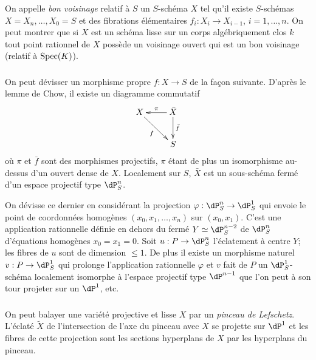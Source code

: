 On appelle \emph{bon voisinage} relatif à $S$ un $S$-schéma $X$ tel qu'il 
existe $S$-schémas $X=X_n,\dotsc,X_0=S$ et des fibrations élémentaires 
$f_i:X_i\to X_{i-1}$, $i=1,\dotsc,n$. On peut montrer \cite[XI 3.3]{sga4} que si 
$X$ est un schéma lisse sur un corps algébriquement clos $k$ tout point 
rationnel de $X$ possède un voisinage ouvert qui est un bon voisinage 
(relatif à $\operatorname{Spec}(K)$). 





\subsubsection{}\label{I:3-4-3}

On peut dévisser un morphisme propre $f:X\to S$ de la façon suivante. 
D'après le lemme de Chow, il existe un diagramme commutatif
\[\xymatrix{
  X \ar[dr]_-f 
    & \ar[l]_-\pi \ar[d]^-{\bar f} \bar X \\
  & S
}\]
où $\pi$ et $\bar f$ sont des morphismes projectifs, $\pi$ étant de plus un 
isomorphisme au-dessus d'un ouvert dense de $X$. Localement sur $S$, $\bar X$ 
est un sous-schéma fermé d'un espace projectif type $\dP_S^n$. 

On dévisse ce dernier en considérant la projection 
$\varphi:\dP_S^n\to\dP_S^1$ qui envoie le point de coordonnées homogènes 
$(x_0,x_1,\dotsc,x_n)$ sur $(x_0,x_1)$. C'est une application rationnelle 
définie en dehors du fermé $Y\simeq \dP_S^{n-2}$ de $\dP_S^n$ d'équations 
homogènes $x_0=x_1=0$. Soit $u:P\to \dP_S^n$ l'éclatement à centre 
$Y$; les fibres de $u$ sont de dimension $\leqslant 1$. De plus il existe un 
morphisme naturel $v:P\to \dP_S^1$ qui prolonge l'application rationnelle 
$\varphi$ et $v$ fait de $P$ un $\dP_S^1$-schéma localement isomorphe à 
l'espace projectif type $\dP^{n-1}$ que l'on peut à son tour projeter sur un 
$\dP^1$, etc. 





\subsubsection{}\label{I:3-4-4}

On peut balayer une variété projective et lisse $X$ par un \emph{pinceau de 
Lefschetz}. L'éclaté $\widetilde X$ de l'intersection de l'axe du pinceau 
avec $X$ se projette sur $\dP^1$ et les fibres de cette projection sont les 
sections hyperplans de $X$ par les hyperplans du pinceau.




















